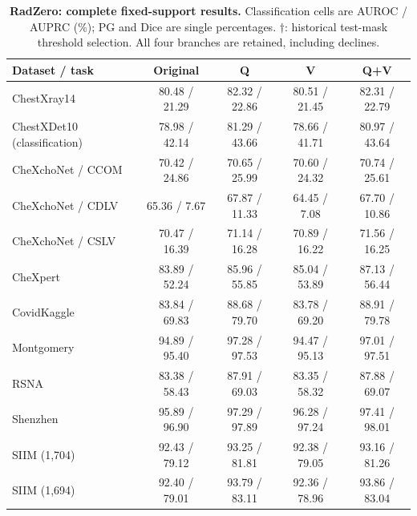 \begin{table}[tp]
\centering
\caption{\textbf{RadZero: complete fixed-support results.} Classification cells are AUROC / AUPRC (\%); PG and Dice are single percentages. $\dagger$: historical test-mask threshold selection. All four branches are retained, including declines.}
\label{tab:supp-fixed-radzero}
\small
\setlength{\tabcolsep}{4pt}
\begin{tabular*}{\textwidth}{@{\extracolsep{\fill}}lcccc@{}}
\toprule
Dataset / task & Original & Q & V & Q+V \\
\midrule
ChestXray14 & 80.48 / 21.29 & 82.32 / 22.86 & 80.51 / 21.45 & 82.31 / 22.79 \\
ChestXDet10 (classification) & 78.98 / 42.14 & 81.29 / 43.66 & 78.66 / 41.71 & 80.97 / 43.64 \\
CheXchoNet / CCOM & 70.42 / 24.86 & 70.65 / 25.99 & 70.60 / 24.32 & 70.74 / 25.61 \\
CheXchoNet / CDLV & 65.36 / 7.67 & 67.87 / 11.33 & 64.45 / 7.08 & 67.70 / 10.86 \\
CheXchoNet / CSLV & 70.47 / 16.39 & 71.14 / 16.28 & 70.89 / 16.22 & 71.56 / 16.25 \\
CheXpert & 83.89 / 52.24 & 85.96 / 55.85 & 85.04 / 53.89 & 87.13 / 56.44 \\
CovidKaggle & 83.84 / 69.83 & 88.68 / 79.70 & 83.78 / 69.20 & 88.91 / 79.78 \\
Montgomery & 94.89 / 95.40 & 97.28 / 97.53 & 94.47 / 95.13 & 97.01 / 97.51 \\
RSNA & 83.38 / 58.43 & 87.91 / 69.03 & 83.35 / 58.32 & 87.88 / 69.07 \\
Shenzhen & 95.89 / 96.90 & 97.29 / 97.89 & 96.28 / 97.24 & 97.41 / 98.01 \\
SIIM (1,704) & 92.43 / 79.12 & 93.25 / 81.81 & 92.38 / 79.05 & 93.16 / 81.26 \\
SIIM (1,694) & 92.40 / 79.01 & 93.79 / 83.11 & 92.36 / 78.96 & 93.86 / 83.04 \\
\bottomrule
\end{tabular*}
\end{table}


